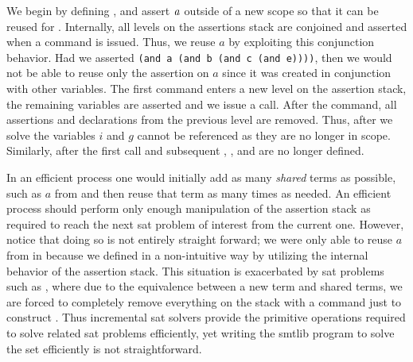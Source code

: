We begin by defining \pV{}, and assert $\mathit{a}$ outside of a new scope so that
it can be reused for \qV{}. Internally, all levels on the assertions stack are
conjoined and asserted when a  command is issued. Thus, we reuse
$a$ by exploiting this conjunction behavior. Had we asserted
\lstinline{(and a (and b (and c (and e))))}, then we would not be able to reuse
only the assertion on $a$ since it was created in conjunction with other
variables. The first  command enters a new level on the assertion
stack, the remaining variables are asserted and we issue a  call.
After the  command, all assertions and declarations from the previous
level are removed. Thus, after we solve \qV{} the variables $i$ and $g$ cannot
be referenced as they are no longer in scope. Similarly, after the first
 call and subsequent , \eV{}, \cV{} and \bV{} are no
longer defined.

In an efficient process one would initially add as many \emph{shared} terms as
possible, such as $a$ from \pV{} and then reuse that term as many times as
needed. An efficient process should perform only enough manipulation of the
assertion stack as required to reach the next \ac{sat} problem of interest from
the current one. However, notice that doing so is not entirely straight forward;
we were only able to reuse $a$ from \pV{} in \qV{} because we defined \pV{} in a
non-intuitive way by utilizing the internal behavior of the assertion stack.
This situation is exacerbated by \ac{sat} problems such as \rV{}, where due to
the equivalence between a new term and shared terms, we are forced to completely
remove everything on the stack with a  command just to construct
\rV{}. Thus incremental \ac{sat} solvers provide the primitive operations
required to solve related \ac{sat} problems efficiently, yet writing the
\acl{smtlib} program to solve the set efficiently is not straightforward.

